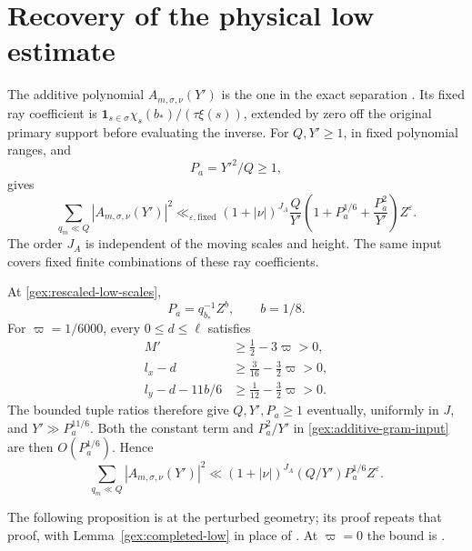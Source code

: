 \section{Recovery of the physical low estimate}
\label{gex:low-recovery}

The additive polynomial \(A_{m,\sigma,\nu}(Y')\) is the one in the
exact separation \cite[(6.2)]{OAI26}.  Its fixed ray coefficient is
\(\mathbf1_{s\in\sigma}\chi_s(b_*)/(\tau\xi(s))\), extended by zero
off the original primary support before evaluating the inverse.
For \(Q,Y'\ge1\), in fixed polynomial ranges, and
\begin{equation}
 P_a=Y'^2/Q\ge1,
\label{gex:additive-gram-parameter}
\end{equation}
\cite[Proposition~15.2]{OAI26} gives
\begin{equation}
 \sum_{q_m\ll Q}|A_{m,\sigma,\nu}(Y')|^2
 \ll_{\varepsilon,\mathrm{fixed}}
 (1+|\nu|)^{J_A}\frac Q{Y'}
 \left(1+P_a^{1/6}+\frac{P_a^2}{Y'}\right)Z^\varepsilon.
\label{gex:additive-gram-input}
\end{equation}
The order \(J_A\) is independent of the moving scales and height.
The same input covers fixed finite combinations of these ray coefficients.

At \eqref{gex:rescaled-low-scales},
\begin{equation}
 P_a=q_{b_*}^{-1}Z^b,\qquad b=1/8.
\label{gex:gram-rescaling-invariant}
\end{equation}
For \(\varpi=1/6000\), every \(0\le d\le\ell\) satisfies
\begin{equation}
\begin{aligned}
 M'&\ge\tfrac12-3\varpi>0,\\
 l_x-d&\ge\tfrac3{16}-\tfrac32\varpi>0,\\
 l_y-d-11b/6&\ge\tfrac1{12}-\tfrac32\varpi>0.
\end{aligned}
\label{gex:uniform-low-scale-margins}
\end{equation}
The bounded tuple ratios therefore give \(Q,Y',P_a\ge1\) eventually,
uniformly in \(J\), and \(Y'\gg P_a^{11/6}\).  Both the constant
term and \(P_a^2/Y'\) in \eqref{gex:additive-gram-input} are then
\(O(P_a^{1/6})\).  Hence
\begin{equation}
 \sum_{q_m\ll Q}|A_{m,\sigma,\nu}(Y')|^2
 \ll (1+|\nu|)^{J_A}(Q/Y')P_a^{1/6}Z^\varepsilon.
\label{gex:additive-gram-at-new-scales}
\end{equation}

The following proposition is \cite[Proposition~15.3]{OAI26} at the
perturbed geometry; its proof repeats that proof, with
Lemma~\ref{gex:completed-low} in place of \cite[Lemma~15.1]{OAI26}.
At \(\varpi=0\) the bound is \cite[(15.6)]{OAI26}.

